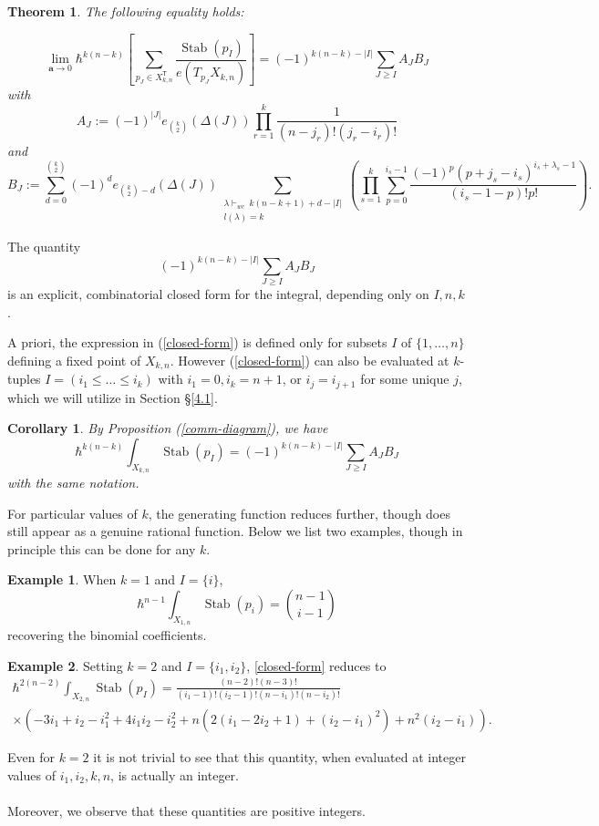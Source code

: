 \documentclass[12 pt]{article}
\theoremstyle{plain}
\newtheorem{theorem}{Theorem}[section]
\theoremstyle{plain}
\theoremstyle{plain}
\newtheorem{corollary}{Corollary}[section]
\theoremstyle{plain}
\theoremstyle{plain}
\theoremstyle{plain}
\theoremstyle{plain}
\theoremstyle{plain}
\theoremstyle{plain}
\theoremstyle{plain}
\theoremstyle{remark}
\theoremstyle{remark}
\theoremstyle{definition}
\theoremstyle{definition}
\theoremstyle{definition}
\newtheorem{example}{Example}[section]
\theoremstyle{definition}
\theoremstyle{definition}
\theoremstyle{definition}
\DeclareMathOperator{\Stab}{Stab}
\DeclareMathOperator{\stab}{\text{Stab}}
\newcommand{\bT}{\mathsf{T}}
\begin{document}
\begin{theorem}\label{lim-calc}The following equality holds:

\begin{equation*}
    \lim_{\textbf{a}\to 0}\hbar^{k(n-k)}\left[\sum_{p_J\in X_{k,n}^\bT}\frac{\Stab(p_I)}{e(T_{p_J}X_{k,n})}\right]=(-1)^{k(n-k)-|I|}\sum\limits_{J\geq I}A_{J}B_{J}
    \end{equation*}
with
\[A_J := (-1)^{|J|}e_{\binom{k}{2}}(\Delta (J)) \prod _{r=1}^{k} \frac{1}{(n-j_r)!(j_r-i_r)!}\]
and
\[B_{J}:= \sum_{d=0}^{\binom{k}{2}} (-1)^d e_{\binom{k}{2}-d}(\Delta(J)) \sum_{\substack{\lambda\vdash_{wc}\ k(n-k+1)+d-|I|\\ l(\lambda)=k}}\left(\prod_{s = 1}^{k} \sum_{p = 0}^{i_s-1} \frac{(-1)^{p}(p + j_s - i_s )^{i_s + \lambda_s-1}}{(i_s-1-p)!p!}\right).
\]
\end{theorem}
The quantity
\begin{equation}\label{closed-form}
(-1)^{k(n-k)-|I|}\sum\limits_{J\geq I}A_{J}B_{J}
\end{equation}
is an explicit, combinatorial closed form for the integral, depending only on $I,n,k$. 

A priori, the expression in (\ref{closed-form}) is defined only for subsets $I$ of $\{1,\dots,n\}$ defining a fixed point of $X_{k,n}$. However (\ref{closed-form}) can also be evaluated at $k$-tuples $I=(i_{1}\leq\dots\leq i_{k})$ with $i_{1}=0, i_{k}=n+1$, or $i_{j}=i_{j+1}$ for some unique $j$, which we will utilize in Section \S\ref{4.1}. 
\begin{corollary}
By Proposition (\ref{comm-diagram}), we have
\[
\hbar^{k(n-k)}\int_{X_{k,n}}\Stab(p_I) = (-1)^{k(n-k)-|I|}\sum_{J\geq I}A_J B_J
\]
with the same notation.
\end{corollary}
For particular values of $k$, the generating function reduces further, though does still appear as a genuine rational function. Below we list two examples, though in principle this can be done for any $k$.
\begin{example}
When $k=1$ and $I=\{i\}$,
\[
\hbar^{n-1}\int_{X_{1,n}}\stab(p_i)=\binom{n-1}{i-1}
\]
recovering the binomial coefficients.
\end{example}
\begin{example}\label{gr2}
Setting $k=2$ and $I=\{i_{1}, i_{2}\}$, \eqref{closed-form} reduces to
\begin{multline*}
\hbar^{2(n-2)}\int_{X_{2,n}}\stab(p_{I})=
\frac{(n-2)!(n-3)!}{(i_{1}-1)!(i_{2}-1)!(n-i_{1})!(n-i_{2})!}\\\times(-3i_{1}+i_{2}-i_{1}^{2}+4i_{1}i_{2}-i_{2}^{2}+n(2(i_{1}-2i_{2}+1)+(i_{2}-i_{1})^{2})+n^{2}(i_{2}-i_{1})).
\end{multline*}
\end{example}
Even for $k=2$ it is not trivial to see that this quantity, when evaluated at integer values of $i_1,i_2,k,n$, is actually an integer.\\\\
Moreover, we observe that these quantities are positive integers.
\end{document}

